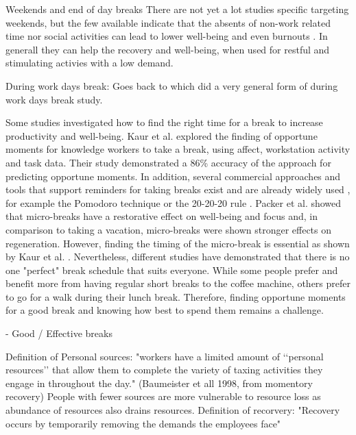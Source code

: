 \documentclass{hasel_thesis}
\begin{document}
Weekends and end of day breaks
There are not yet a lot studies specific targeting weekends, but the few available indicate that the absents of non-work related time nor social activities can lead to lower well-being and even burnouts \cite{Fritz.2005}.
In generall they can help the recovery and well-being, when used for restful and stimulating activies with a low demand.

During work days break:
Goes back to \cite{Mayo.1933} which did a very general form  of during work days break study.


Some studies investigated how to find the right time for a break to increase productivity and well-being. Kaur et al. \cite{Kaur.2020} explored the finding of opportune moments for knowledge workers to take a break, using affect, workstation activity and task data. Their study demonstrated a 86\% accuracy of the approach for predicting opportune moments. In addition, several commercial approaches and tools that support reminders for taking breaks exist and are already widely used \cite{Alghamdi.2020}, for example the Pomodoro technique \cite{Cirillo.2006} or the 20-20-20 rule \cite{Min.2019}. Packer et al. \cite{Packer.2021} showed that micro-breaks have a restorative effect on well-being and focus and, in comparison to taking a vacation, micro-breaks were shown stronger effects on regeneration.  However, finding the timing of the micro-break is essential as shown by Kaur et al. \cite{Kaur.2020}. Nevertheless, different studies \cite{KimS.ParkY.&Niu.2017} \cite{Berman.2007} have demonstrated that there is no one "perfect" break schedule that suits everyone. While some people prefer and benefit more from having regular short breaks to the coffee machine, others prefer to go for a walk during their lunch break. Therefore, finding opportune moments for a good break and knowing how best to spend them remains a challenge. 

- Good / Effective breaks



 Definition of Personal sources: "workers have a limited amount of ‘‘personal resources’’ that
allow them to complete the variety of taxing activities they engage in
throughout the day." (Baumeister et all 1998, from momentory recovery)
People with fewer sources are more vulnerable to resource loss as abundance of resources also drains resources.
Definition of recorvery: "Recovery occurs by temporarily
removing the demands the employees face"
\end{document}
